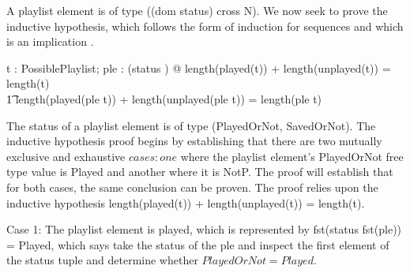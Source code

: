 \documentclass[a4paper,10pt,fleqn]{article}
\begin{document}
\noindent A playlist element is of type ((dom status) cross N).  We now seek to prove the inductive hypothesis, which follows the form of induction for sequences and which is an implication \citep[page 157]{simpson-notes}.

\bigskip

\begin{zed}
\forall t : PossiblePlaylist; ple : (\dom status \cross \nat) @ length(played(t)) + length(unplayed(t)) = length(t) \implies \\
\t1 length(played(\langle ple \rangle \cat t)) + length(unplayed(\langle ple \rangle \cat t)) = length(\langle ple \rangle \cat t)
\end{zed}

\noindent The status of a playlist element is of type (PlayedOrNot, SavedOrNot). The inductive hypothesis proof begins by establishing that there are two mutually exclusive and exhaustive $cases : one$ where the playlist element's PlayedOrNot free type value is Played and another where it is NotP.  The proof will establish that for both cases, the same conclusion can be proven. The proof relies upon the inductive hypothesis length(played(t)) + length(unplayed(t)) = length(t). 

\bigskip

\noindent Case 1: The playlist element is played, which is represented by fst(status fst(ple)) = Played, which says take the status of the ple and inspect the first element of the status tuple and determine whether $PlayedOrNot = Played$.

\bigskip

\begin{center}
\end{center}
\bigskip
\end{document}
